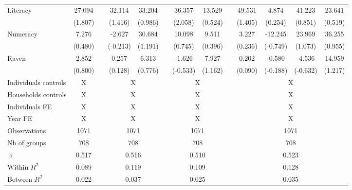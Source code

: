 \begin{table}[htbp]
{\begin{tabular}{lcccccccccccc}
    Literacy & \cellcolor[rgb]{ 1,  1,  0}27.094 &       & 32.114 & 33.204 &       & \cellcolor[rgb]{ 1,  1,  0}36.357 & 13.529 &       & 49.531 & 4.874 & 41.223 & 23.641 \\
          & (1.807) &       & (1.416) & (0.986) &       & (2.058) & (0.524) &       & (1.405) & (0.254) & (0.851) & (0.519) \\
    Numeracy & 7.276 &       & -2.627 & 30.684 &       & 10.098 & 9.511 &       & 3.227 & -12.245 & 23.969 & 36.255 \\
          & (0.480) &       & (-0.213) & (1.191) &       & (0.745) & (0.396) &       & (0.236) & (-0.749) & (1.073) & (0.955) \\
    Raven & 2.852 &       & 0.257 & 6.313 &       & -1.626 & 7.927 &       & 0.202 & -0.580 & -4.536 & 14.959 \\
          & (0.800) &       & (0.128) & (0.776) &       & (-0.533) & (1.162) &       & (0.090) & (-0.188) & (-0.632) & (1.217) \\
\cmidrule{1-2}\cmidrule{4-5}\cmidrule{7-8}\cmidrule{10-13}    Individuals controls & X     &       & \multicolumn{2}{c}{X} &       & \multicolumn{2}{c}{X} &       & \multicolumn{4}{c}{X} \\
    Households controls & X     &       & \multicolumn{2}{c}{X} &       & \multicolumn{2}{c}{X} &       & \multicolumn{4}{c}{X} \\
    Individuals FE & X     &       & \multicolumn{2}{c}{X} &       & \multicolumn{2}{c}{X} &       & \multicolumn{4}{c}{X} \\
    Year FE & X     &       & \multicolumn{2}{c}{X} &       & \multicolumn{2}{c}{X} &       & \multicolumn{4}{c}{X} \\
    \midrule
    Observations & 1071  &       & \multicolumn{2}{c}{1071} &       & \multicolumn{2}{c}{1071} &       & \multicolumn{4}{c}{1071} \\
    Nb of groups & 708   &       & \multicolumn{2}{c}{708} &       & \multicolumn{2}{c}{708} &       & \multicolumn{4}{c}{708} \\
    $\uprho$ & 0.517 &       & \multicolumn{2}{c}{0.516} &       & \multicolumn{2}{c}{0.510} &       & \multicolumn{4}{c}{0.523} \\
    Within $R^2$ & 0.089 &       & \multicolumn{2}{c}{0.119} &       & \multicolumn{2}{c}{0.109} &       & \multicolumn{4}{c}{0.128} \\
    Between $R^2$ & 0.022 &       & \multicolumn{2}{c}{0.037} &       & \multicolumn{2}{c}{0.025} &       & \multicolumn{4}{c}{0.035} \\

\end{tabular}}
\end{table}

